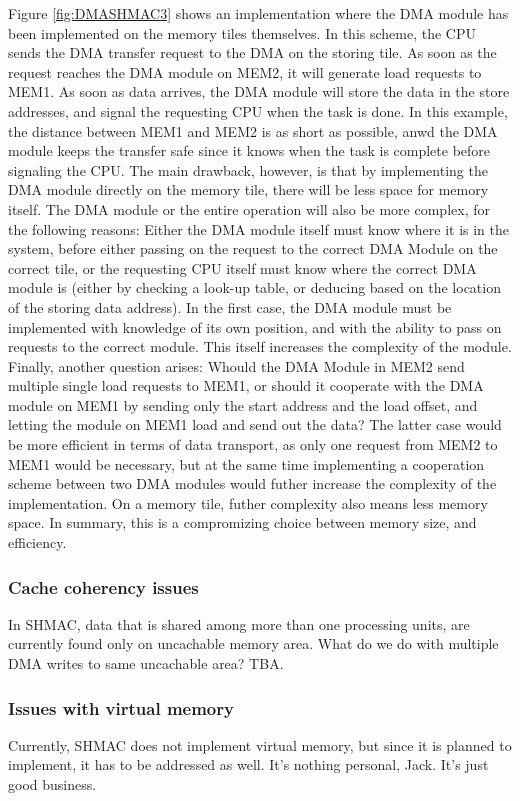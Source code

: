 Figure \ref{fig:DMASHMAC3} shows an implementation where the DMA module has been implemented on the memory tiles themselves.
In this scheme, the CPU sends the DMA transfer request to the DMA on the storing tile.
As soon as the request reaches the DMA module on MEM2, it will generate load requests to MEM1.
As soon as data arrives, the DMA module will store the data in the store addresses, and signal the requesting CPU when the task is done.
In this example, the distance between MEM1 and MEM2 is as short as possible, anwd the DMA module keeps the transfer safe since it knows when the task is complete before signaling the CPU.
The main drawback, however, is that by implementing the DMA module directly on the memory tile, there will be less space for memory itself.
The DMA module or the entire operation will also be more complex, for the following reasons:
Either the DMA module itself must know where it is in the system, before either passing on the request to the correct DMA Module on the correct tile, or the requesting CPU itself must know where the correct DMA module is (either by checking a look-up table, or deducing based on the location of the storing data address).
In the first case, the DMA module must be implemented with knowledge of its own position, and with the ability to pass on requests to the correct module.
This itself increases the complexity of the module.  
Finally, another question arises: Whould the DMA Module in MEM2 send multiple single load requests to MEM1, or should it cooperate with the DMA module on MEM1 by sending only the start address and the load offset, and letting the module on MEM1 load and send out the data?
The latter case would be more efficient in terms of data transport, as only one request from MEM2 to MEM1 would be necessary, but at the same time implementing a cooperation scheme between two DMA modules would futher increase the complexity of the implementation.
On a memory tile, futher complexity also means less memory space.
In summary, this is a compromizing choice between memory size, and efficiency.
 
\subsubsection{Cache coherency issues}
In SHMAC, data that is shared among more than one processing units, are currently found only on uncachable memory area.
What do we do with multiple DMA writes to same uncachable area?
TBA.

\subsubsection{Issues with virtual memory}
Currently, SHMAC does not implement virtual memory, but since it is planned to implement, it has to be addressed as well.
It's nothing personal, Jack. It's just good business. 

